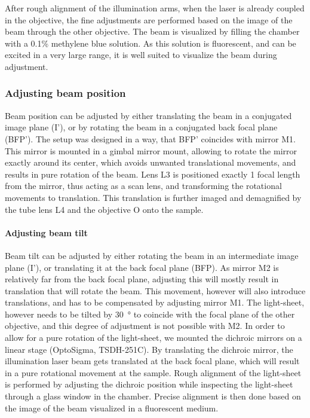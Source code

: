     After rough alignment of the illumination arms, when the laser is already coupled in the objective, the fine adjustments are performed based on the image of the beam through the other objective. The beam is visualized by filling the chamber with a 0.1\% methylene blue solution. As this solution is fluorescent, and can be excited in a very large range, it is well suited to visualize the beam during adjustment.

    \subsubsection{Adjusting beam position}
      Beam position can be adjusted by either translating the beam in a conjugated image plane (I'), or by rotating the beam in a conjugated back focal plane (BFP'). The setup was designed in a way, that BFP' coincides with mirror M1. This mirror is mounted in a gimbal mirror mount, allowing to rotate the mirror exactly around its center, which avoids unwanted translational movements, and results in pure rotation of the beam. Lens L3 is positioned exactly 1 focal length from the mirror, thus acting as a scan lens, and transforming the rotational movements to translation. This translation is further imaged and demagnified by the tube lens L4 and the objective O onto the sample.


    \paragraph{Adjusting beam tilt}
      Beam tilt can be adjusted by either rotating the beam in an intermediate image plane (I'), or translating it at the back focal plane (BFP). As mirror M2 is relatively far from the back focal plane, adjusting this will mostly result in translation that will rotate the beam. This movement, however will also introduce translations, and has to be compensated by adjusting mirror M1. The light-sheet, however needs to be tilted by \SI{30}{\degree} to coincide with the focal plane of the other objective, and this degree of adjustment is not possible with M2. In order to allow for a pure rotation of the light-sheet, we mounted the dichroic mirrors on a linear stage (OptoSigma, TSDH-251C). By translating the dichroic mirror, the illumination laser beam gets translated at the back focal plane, which will result in a pure rotational movement at the sample. Rough alignment of the light-sheet is performed by adjusting the dichroic position while inspecting the light-sheet through a glass window in the chamber. Precise alignment is then done based on the image of the beam visualized in a fluorescent medium.


